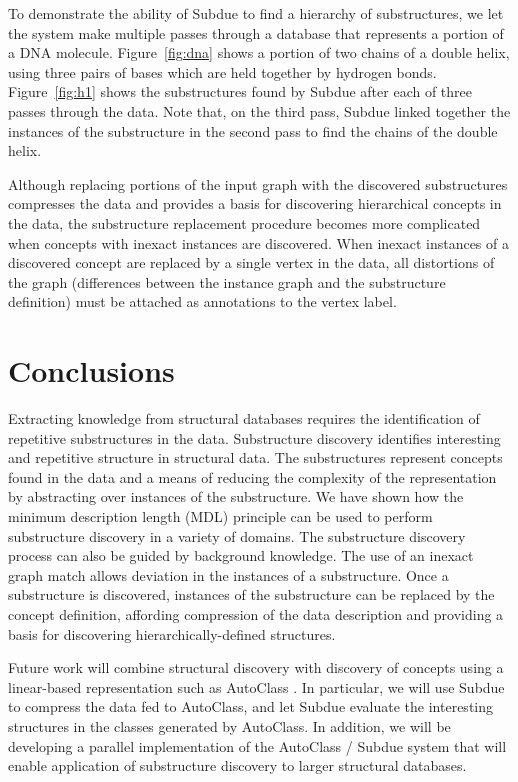 

To demonstrate the ability of {\sc Subdue} to find a hierarchy of substructures,
we let the system make multiple passes through a database that represents
a portion of a DNA molecule.
Figure~\ref{fig:dna} shows a portion of two chains of a double
helix, using three pairs of bases which are held together by hydrogen
bonds.  Figure~\ref{fig:h1} shows the
substructures found by {\sc Subdue} after each of three passes through the
data.  Note that, on the third pass, {\sc Subdue}
linked together the instances of the substructure in the second pass to
find the chains of the double helix.

Although replacing portions of the input graph with the discovered substructures
compresses the data and provides a basis for discovering hierarchical concepts
in the data, the substructure replacement procedure becomes more complicated
when concepts with inexact instances
are discovered.  When inexact instances of a discovered
concept are replaced by a single vertex in the data, all distortions of the
graph (differences between the instance graph and the substructure definition)
must be attached as annotations to the vertex label.

\section{Conclusions}
\label{s:conclusions}

Extracting knowledge from structural databases requires the identification of
repetitive substructures in the data.  Substructure discovery identifies
interesting and repetitive structure in structural data.
The substructures represent concepts found in the data and a means of
reducing the complexity of the representation by abstracting over instances of
the substructure.  We have shown how the minimum description length (MDL)
principle can be used to perform substructure discovery in a variety of
domains.  The substructure discovery process can also be guided by
background knowledge.  The use of an inexact graph match
allows deviation in the instances of a substructure.  Once a substructure
is discovered, instances of the substructure can be replaced by the concept
definition, affording compression of the data description and providing
a basis for discovering hierarchically-defined structures.

Future work will combine structural discovery with discovery of concepts
using a linear-based representation such as AutoClass \cite{AutoClass88}.
In particular, we will use
{\sc Subdue} to compress the data fed to AutoClass,
and let {\sc Subdue} evaluate the interesting structures in the classes
generated by AutoClass.
In addition, we will be developing a parallel implementation of the
{\sc AutoClass / Subdue} system that will enable application of substructure
discovery to larger structural databases.

